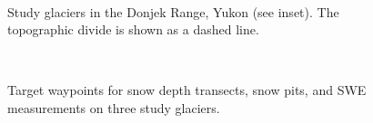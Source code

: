 \documentclass{sfuthesis}
\begin{document}
\begin{landscape}
\begin{figure}
	\centering
	\\
	\caption{Study glaciers in the Donjek Range, Yukon (see inset). The topographic divide is shown as a dashed line.}
	\label{studysites}
\end{figure}

\begin{figure}
	\centering
	\\
	\caption{Target waypoints for snow depth transects, snow pits, and SWE measurements on three study glaciers.}
	\label{transect_planned}
	\end{figure}


\end{landscape}
\end{document}
